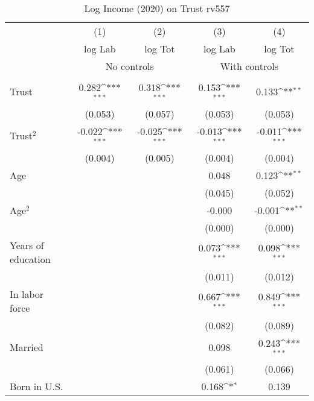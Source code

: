 \begin{table}[htbp]\centering
\def\sym#1{\ifmmode^{#1}\else\(^{#1}\)\fi}
\caption{Log Income (2020) on Trust rv557}
\begin{tabular}{l*{4}{c}}
\toprule
          &\multicolumn{1}{c}{(1)}&\multicolumn{1}{c}{(2)}&\multicolumn{1}{c}{(3)}&\multicolumn{1}{c}{(4)}\\
          &\multicolumn{1}{c}{log Lab}&\multicolumn{1}{c}{log Tot}&\multicolumn{1}{c}{log Lab}&\multicolumn{1}{c}{log Tot}\\
& \multicolumn{2}{c}{No controls} & \multicolumn{2}{c}{With controls} \\\\ \cmidrule(lr){2-3}\cmidrule(lr){4-5}
Trust     &    0.282\sym{***}&    0.318\sym{***}&    0.153\sym{***}&    0.133\sym{**} \\
          &  (0.053)         &  (0.057)         &  (0.053)         &  (0.053)         \\
Trust$^{2}$&   -0.022\sym{***}&   -0.025\sym{***}&   -0.013\sym{***}&   -0.011\sym{***}\\
          &  (0.004)         &  (0.005)         &  (0.004)         &  (0.004)         \\
Age       &                  &                  &    0.048         &    0.123\sym{**} \\
          &                  &                  &  (0.045)         &  (0.052)         \\
Age$^{2}$ &                  &                  &   -0.000         &   -0.001\sym{**} \\
          &                  &                  &  (0.000)         &  (0.000)         \\
Years of education&                  &                  &    0.073\sym{***}&    0.098\sym{***}\\
          &                  &                  &  (0.011)         &  (0.012)         \\
In labor force&                  &                  &    0.667\sym{***}&    0.849\sym{***}\\
          &                  &                  &  (0.082)         &  (0.089)         \\
Married   &                  &                  &    0.098         &    0.243\sym{***}\\
          &                  &                  &  (0.061)         &  (0.066)         \\
Born in U.S.&                  &                  &    0.168\sym{*}  &    0.139         \\

\end{tabular}
\end{table}
